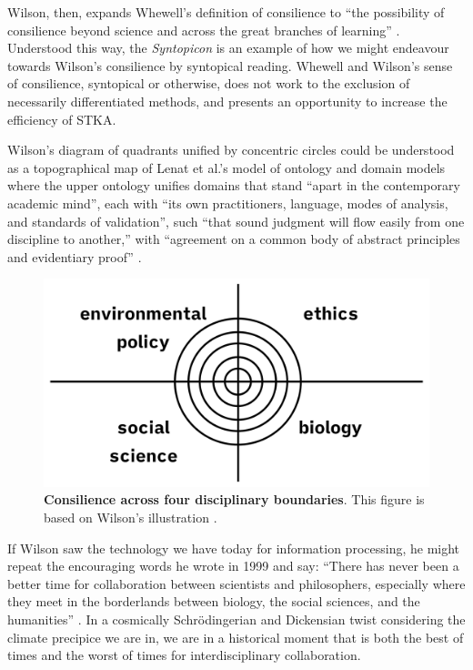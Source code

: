 Wilson, then, expands Whewell’s definition of consilience to “the possibility of consilience beyond science and across the great branches of learning” \citep[p. 9]{wilson_consilience_1999}. Understood this way, the \textit{Syntopicon} is an example of how we might endeavour towards Wilson’s consilience by syntopical reading. Whewell and Wilson’s sense of consilience, syntopical or otherwise, does not work to the exclusion of necessarily differentiated methods, and presents an opportunity to increase the efficiency of STKA.

Wilson’s diagram of quadrants unified by concentric circles could be understood as a topographical map of Lenat et al.’s model of ontology and domain models where the upper ontology unifies domains that stand “apart in the contemporary academic mind”, each with “its own practitioners, language, modes of analysis, and standards of validation”, \citep[p. 9]{wilson_consilience_1999} such “that sound judgment will flow easily from one discipline to another,” with “agreement on a common body of abstract principles and evidentiary proof” \citep[p. 11]{wilson_consilience_1999}.

\begin{figure}[h]
    \centering
    \includegraphics[width=0.7\linewidth]{figures/f12.png}
    \caption[Consilience across four disciplinary boundaries]{\textbf{Consilience across four disciplinary boundaries}. This figure is based on Wilson’s illustration \citep[p. 10]{wilson_consilience_1999}.}
    \label{f12}
\end{figure}
\par
\FloatBarrier

If Wilson saw the technology we have today for information processing, he might repeat the encouraging words he wrote in 1999 and say: “There has never been a better time for collaboration between scientists and philosophers, especially where they meet in the borderlands between biology, the social sciences, and the humanities” \citep[p. 12]{wilson_consilience_1999}. In a cosmically Schrödingerian and Dickensian twist considering the climate precipice we are in, we are in a historical moment that is both the best of times and the worst of times for interdisciplinary collaboration.


